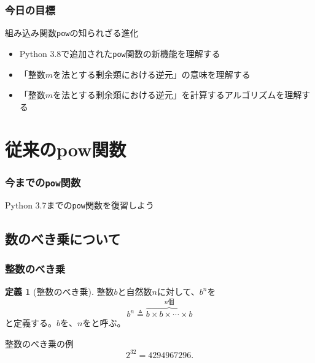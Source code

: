 \documentclass[aspectratio=169,dvipdfmx,14pt,notheorems]{beamer}
\theoremstyle{definition}
\newtheorem{definition}{定義}
\begin{document}
\begin{frame}\frametitle{今日の目標}
\begin{block}{組み込み関数\texttt{pow}の知られざる進化}
\begin{itemize}
\item Python 3.8で追加された\texttt{pow}関数の新機能を理解する
\item 「整数$m$を法とする剰余類における逆元」の意味を理解する
\item 「整数$m$を法とする剰余類における逆元」を計算するアルゴリズムを理解する
\end{itemize}
\end{block}
\end{frame}

\section{従来のpow関数}

\begin{frame}\frametitle{今までの\texttt{pow}関数}
\begin{center}
\Large Python 3.7までの\texttt{pow}関数を復習しよう
\end{center}
\end{frame}

\subsection{数のべき乗について}

\begin{frame}\frametitle{整数のべき乗}
\begin{definition}[整数のべき乗]
整数$b$と自然数$n$に対して、$b^{n}$を
\begin{equation*}
b^{n} \triangleq \overbrace{b \times b \times \cdots \times b}^{n\text{個}}
\end{equation*}
と定義する。$b$を、$n$をと呼ぶ。
\end{definition}

\begin{exampleblock}{整数のべき乗の例}
\begin{equation*}
2^{32} = 4294967296.
\end{equation*}
\end{exampleblock}

\end{frame}
\end{document}
